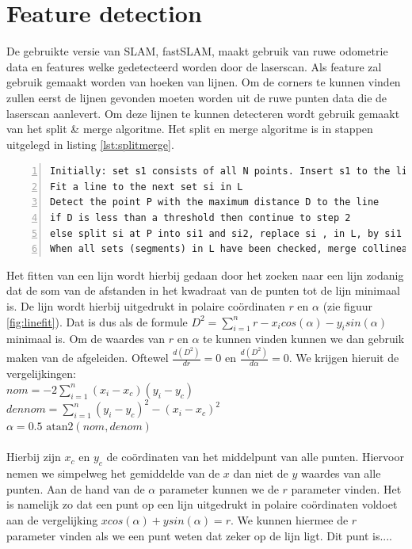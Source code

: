 \documentclass[a4paper]{article}
\begin{document}
\section{Feature detection}
De gebruikte versie van SLAM, fastSLAM, maakt gebruik van ruwe odometrie data en features welke gedetecteerd worden door de laserscan.
Als feature zal gebruik gemaakt worden van hoeken van lijnen. Om de corners te kunnen vinden zullen eerst de lijnen gevonden moeten worden uit de ruwe punten data die de laserscan aanlevert. Om deze lijnen te kunnen detecteren wordt gebruik gemaakt van het split \& merge algoritme. Het split en merge algoritme is in stappen uitgelegd in listing \ref{lst:splitmerge}.

\begin{lstlisting}[caption= Split \& merge algorithm, label=lst:splitmerge, numbers=left]
Initially: set s1 consists of all N points. Insert s1 to the list L. Set index i=1
Fit a line to the next set si in L
Detect the point P with the maximum distance D to the line
if D is less than a threshold then continue to step 2
else split si at P into si1 and si2, replace si , in L, by si1 and si2. Continue to step 2
When all sets (segments) in L have been checked, merge collinear segments.
\end{lstlisting}

\noindent Het fitten van een lijn wordt hierbij gedaan door het zoeken naar een lijn zodanig dat de som van de afstanden in het kwadraat van de punten tot de lijn minimaal is. De lijn wordt hierbij uitgedrukt in polaire co\"ordinaten $r$ en $\alpha$ (zie figuur \ref{fig:linefit}). 
Dat is dus als de formule $D^2 = \sum\limits_{i=1}^n r-x_i cos(\alpha) - y_i sin(\alpha)$ minimaal is. Om de waardes van $r$ en $\alpha$ te kunnen vinden kunnen we dan gebruik maken van de afgeleiden. Oftewel $\frac{d(D^2)}{dr} = 0$ en $\frac{d(D^2)}{d\alpha} = 0$.
We krijgen hieruit de vergelijkingen:\\
$nom =  -2\sum\limits_{i=1}^n (x_i - x_c)(y_i - y_c)$\\
$dennom =  \sum\limits_{i=1}^n (y_i - y_c)^2 - (x_i - x_c)^2$\\
$\alpha = 0.5\mbox{ atan2}(nom, denom)$\\\\
Hierbij zijn $x_c$ en $y_c$ de co\"ordinaten van het middelpunt van alle punten. Hiervoor nemen we simpelweg het gemiddelde van de $x$ dan niet de $y$ waardes van alle punten. Aan de hand van de $\alpha$ parameter kunnen we de $r$ parameter vinden.
Het is namelijk zo dat een punt op een lijn uitgedrukt in polaire co\"ordinaten voldoet aan de vergelijking $x cos(\alpha) + y sin(\alpha) = r$. We kunnen hiermee de $r$ parameter vinden als we een punt weten dat zeker op de lijn ligt. Dit punt is....
\end{document}
